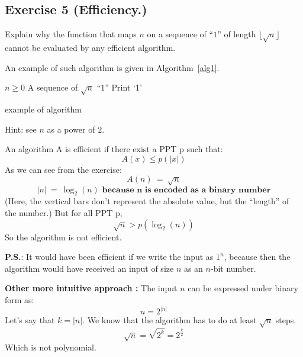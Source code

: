 \subsection{Exercise 5 (Efficiency.)}

Explain why the function that maps $n$ on a sequence of ``$1$'' of length
$\lfloor \sqrt{n}\rfloor$ cannot be evaluated by any efficient algorithm.

An example of such algorithm is given in Algorithm~\ref{alg1}.
\begin{algorithm}
\begin{algorithmic}
    \REQUIRE $n \geq 0$
    \ENSURE A sequence of $\sqrt{n}$ ``$1$''
        \STATE Print `1'
    \ENDFOR
\end{algorithmic}
\caption{example of algorithm}
\label{alg1}      
\end{algorithm}

Hint: see $n$ as a power of $2$.


\begin{solution}
  An algorithm A is efficient if there exist a PPT p such that:
  \[ A(x) \leq p(|x|) \]
  As we can see from the exercise:
  \[A(n) \ = \ \sqrt{n} \]
  \[ |n| \ = \ \log_2(n) \textbf{ because n is encoded as a binary number} \]
  (Here, the vertical bars don't represent the absolute value, but the ``length'' of the number.)
  But for all PPT p,
  \[ \sqrt{n}  >  p(\log_2(n)) \]
  So the algorithm is not efficient.

  \textbf{P.S.}: It would have been efficient if we write the input as $1^n$, because then the algorithm would have received an input of size $n$ as an $n$-bit number.

  \textbf{Other more intuitive approach : }
  The input $n$ can be expressed under binary form as: \[n = 2^{|n|}\]
  Let's say that $k = |n|$. We know that the algorithm has to do at least $\sqrt{n}$ steps.
  \[\sqrt{n} = \sqrt{2^k} = 2^{\frac{k}{2}}\]
  Which is not polynomial.
\end{solution}

